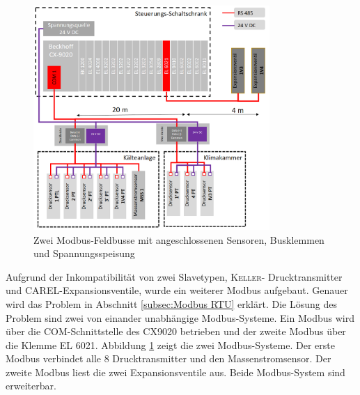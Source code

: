 \begin{figure}[htb]
\centering	
	\includegraphics[page= 2, width=0.8\textwidth]{Pictures/ModbusVerkabelung.png}
\caption{Zwei Modbus-Feldbusse mit angeschlossenen Sensoren, Busklemmen und Spannungsspeisung}
\label{fig:ModbusVerkabelung}
\end{figure}
 
 
  Aufgrund der Inkompatibilität von zwei Slavetypen, \textsc{Keller}- Drucktransmitter und \textsc{CAREL}-Expansionsventile, wurde ein weiterer Modbus aufgebaut. Genauer wird das Problem in Abschnitt \ref{subsec:Modbus RTU} erklärt. Die Lösung des Problem sind zwei von einander unabhängige Modbus-Systeme. Ein Modbus wird über die COM-Schnittstelle des CX9020 betrieben und der zweite Modbus über die Klemme EL 6021. Abbildung \ref{fig:ModbusVerkabelung} zeigt die zwei Modbus-Systeme. Der erste Modbus verbindet alle 8 Drucktransmitter und den Massenstromsensor. Der zweite Modbus liest die zwei Expansionsventile aus. Beide Modbus-System sind erweiterbar. 
